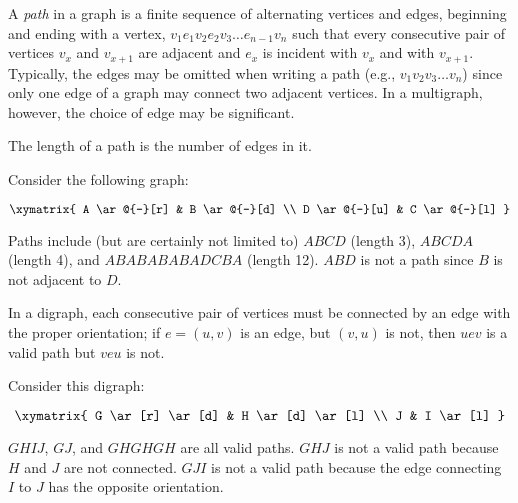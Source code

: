 \documentclass[12pt]{article}
\begin{document}
A \emph{path} in a graph is a finite sequence of alternating vertices and edges, beginning and ending with a vertex, $v_1e_1v_2e_2v_3\dots e_{n-1}v_n$ such that every consecutive pair of vertices $v_x$ and $v_{x+1}$ are adjacent and $e_x$ is incident with $v_x$ and with $v_{x+1}$.  Typically, the edges may be omitted when writing a path (e.g., $v_1v_2v_3\dots v_n$) since only one edge of a graph may connect two adjacent vertices.  In a multigraph, however, the choice of edge may be significant.  

The length of a path is the number of edges in it.

Consider the following graph:

$$\xymatrix{
A \ar@{-}[r] & B \ar@{-}[d] \\
D \ar@{-}[u] & C \ar@{-}[l] }$$

Paths include (but are certainly not limited to) $ABCD$ (length 3), $ABCDA$ (length 4), and $ABABABABADCBA$ (length 12).  $ABD$ is not a path since $B$ is not adjacent to $D$.

In a digraph, each consecutive pair of vertices must be connected by an edge with the proper orientation; if $e=(u,v)$ is an edge, but $(v,u)$ is not, then $uev$ is a valid path but $veu$ is not.

Consider this digraph:

$$\xymatrix{
G \ar[r] \ar[d] & H \ar[d] \ar[l] \\
J & I \ar[l] }$$

$GHIJ$, $GJ$, and $GHGHGH$ are all valid paths.  $GHJ$ is not a valid path because $H$ and $J$ are not connected.  $GJI$ is not a valid path because the edge connecting $I$ to $J$ has the opposite orientation.
\end{document}
